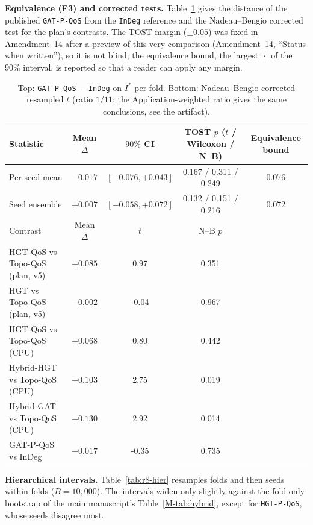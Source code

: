 \noindent\textbf{Equivalence (F3) and corrected tests.} Table~\ref{tab:r8-tost} gives the distance of the published \texttt{GAT-P-QoS} from the \texttt{InDeg} reference and the Nadeau--Bengio corrected test for the plan's contrasts. The TOST margin ($\pm 0.05$) was fixed in Amendment~14 after a preview of this very comparison (Amendment~14, ``Status when written''), so it is not blind; the equivalence bound, the largest $|\cdot|$ of the $90\%$ interval, is reported so that a reader can apply any margin.

\begin{table}[htbp]
\centering
\scriptsize
\caption{Top: \texttt{GAT-P-QoS} $-$ \texttt{InDeg} on $I^*$ per fold. Bottom: Nadeau--Bengio corrected resampled $t$ (ratio $1/11$; the Application-weighted ratio gives the same conclusions, see the artifact).}
\label{tab:r8-tost}
\begin{tabular}{lcccc}
\toprule
Statistic & Mean $\Delta$ & $90\%$ CI & TOST $p$ ($t$ / Wilcoxon / N--B) & Equivalence bound \\
\midrule
Per-seed mean & $-0.017$ & $[-0.076, +0.043]$ & 0.167 / 0.311 / 0.249 & 0.076 \\
Seed ensemble & $+0.007$ & $[-0.058, +0.072]$ & 0.132 / 0.151 / 0.216 & 0.072 \\
\midrule
Contrast & Mean $\Delta$ & $t$ & N--B $p$ & \\
\midrule
HGT-QoS vs Topo-QoS (plan, v5) & $+0.085$ & 0.97 & 0.351 & \\
HGT vs Topo-QoS (plan, v5) & $-0.002$ & -0.04 & 0.967 & \\
HGT-QoS vs Topo-QoS (CPU) & $+0.068$ & 0.80 & 0.442 & \\
Hybrid-HGT vs Topo-QoS (CPU) & $+0.103$ & 2.75 & 0.019 & \\
Hybrid-GAT vs Topo-QoS (CPU) & $+0.130$ & 2.92 & 0.014 & \\
GAT-P-QoS vs InDeg & $-0.017$ & -0.35 & 0.735 & \\
\bottomrule
\end{tabular}
\end{table}

\noindent\textbf{Hierarchical intervals.} Table~\ref{tab:r8-hier} resamples folds and then seeds within folds ($B = 10{,}000$). The intervals widen only slightly against the fold-only bootstrap of the main manuscript's Table~\ref{M-tab:hybrid}, except for \texttt{HGT-P-QoS}, whose seeds disagree most.

